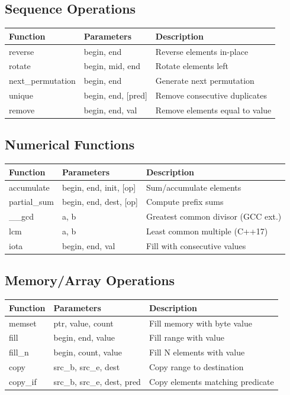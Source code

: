 \documentclass[10pt,letterpaper,landscape,twocolumn]{article}
\begin{document}
\subsection*{Sequence Operations}
\begin{tabularx}{\linewidth}{|l|l|X|}
    \hline
    \textbf{Function} & \textbf{Parameters} & \textbf{Description} \\
    \hline
    reverse & begin, end & Reverse elements in-place \\
    \hline
    rotate & begin, mid, end & Rotate elements left \\
    \hline
    next\_permutation & begin, end & Generate next permutation \\
    \hline
    unique & begin, end, [pred] & Remove consecutive duplicates \\
    \hline
    remove & begin, end, val & Remove elements equal to value \\
    \hline
\end{tabularx}

\subsection*{Numerical Functions}
\begin{tabularx}{\linewidth}{|l|l|X|}
    \hline
    \textbf{Function} & \textbf{Parameters} & \textbf{Description} \\
    \hline
    accumulate & begin, end, init, [op] & Sum/accumulate elements \\
    \hline
    partial\_sum & begin, end, dest, [op] & Compute prefix sums \\
    \hline
    \_\_gcd & a, b & Greatest common divisor (GCC ext.) \\
    \hline
    lcm & a, b & Least common multiple (C++17) \\
    \hline
    iota & begin, end, val & Fill with consecutive values \\
    \hline
\end{tabularx}

\subsection*{Memory/Array Operations}
\begin{tabularx}{\linewidth}{|l|l|X|}
    \hline
    \textbf{Function} & \textbf{Parameters} & \textbf{Description} \\
    \hline
    memset & ptr, value, count & Fill memory with byte value \\
    \hline
    fill & begin, end, value & Fill range with value \\
    \hline
    fill\_n & begin, count, value & Fill N elements with value \\
    \hline
    copy & src\_b, src\_e, dest & Copy range to destination \\
    \hline
    copy\_if & src\_b, src\_e, dest, pred & Copy elements matching predicate \\
    \hline
\end{tabularx}
\end{document}
